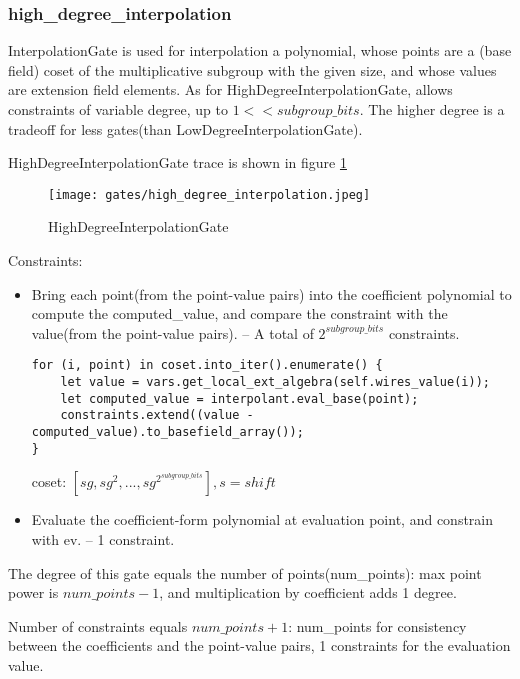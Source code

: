 \subsubsection{high\_degree\_interpolation}

InterpolationGate is used for interpolation a polynomial, whose points are a (base field) coset of the multiplicative subgroup 
with the given size, and whose values are extension field elements. As for HighDegreeInterpolationGate,  allows constraints of variable degree, 
up to $1<<subgroup\_bits$. The higher degree is a tradeoff for less gates(than LowDegreeInterpolationGate).


HighDegreeInterpolationGate trace is shown in figure \ref{fig:high-degree-interpolation}

\begin{figure}[!ht]
    \centering
    \texttt{[image: gates/high\_degree\_interpolation.jpeg]}
    \caption{HighDegreeInterpolationGate}
    \label{fig:high-degree-interpolation}
\end{figure}


Constraints:
\begin{itemize}
    \item Bring each point(from the point-value pairs) into the coefficient polynomial to compute the computed\_value, 
    and compare the constraint with the value(from the point-value pairs). -- A total of $2^{subgroup\_bits}$ constraints.
    \begin{lstlisting}
for (i, point) in coset.into_iter().enumerate() {
    let value = vars.get_local_ext_algebra(self.wires_value(i));
    let computed_value = interpolant.eval_base(point);
    constraints.extend((value - computed_value).to_basefield_array());
}
    \end{lstlisting}
    coset: $[sg, sg^2,...,sg^{2^{subgroup\_bits}}], s=shift$
    \item Evaluate the coefficient-form polynomial at evaluation point, and constrain with ev. -- 1 constraint.
\end{itemize}

The degree of this gate equals the number of points(num\_points): max point power is $num\_points - 1$, and multiplication by coefficient adds 1 degree.

Number of constraints equals $num\_points + 1$: num\_points for consistency between the coefficients and the point-value pairs, 1 constraints for the evaluation value. 